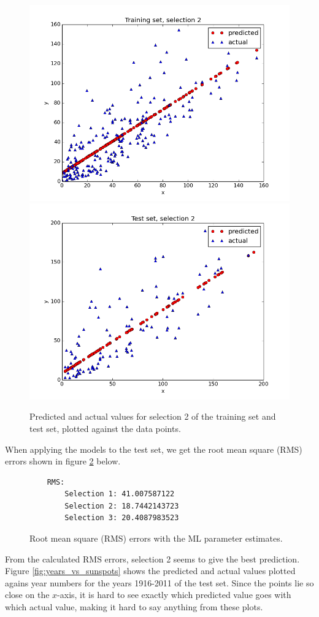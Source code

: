 \documentclass[a4paper]{article}
\begin{document}
\begin{figure}[H]
  \begin{adjustwidth}{-7em}{-7em}
    \centering
    \includegraphics[width=.47\linewidth]{figures/training_set_selection2.png}
    \includegraphics[width=.47\linewidth]{figures/test_set_selection2.png}
  \end{adjustwidth}
  \caption{Predicted and actual values for selection 2 of the training set and test set, plotted against the data points.}
  \label{fig:selection2}
\end{figure}

When applying the models to the test set, we get the root mean square (RMS) errors shown in figure \ref{fig:rms_ml} below.

\begin{figure}[H]
	\begin{lstlisting}
	RMS:
        Selection 1: 41.007587122
        Selection 2: 18.7442143723
        Selection 3: 20.4087983523
	\end{lstlisting}
	\caption{Root mean square (RMS) errors with the ML parameter estimates.}
	\label{fig:rms_ml}
\end{figure}

From the calculated RMS errors, selection 2 seems to give the best prediction. Figure \ref{fig:years_vs_sunspots} shows the predicted and actual values plotted agains year numbers for the years 1916-2011 of the test set. Since the points lie so close on the $x$-axis, it is hard to see exactly which predicted value goes with which actual value, making it hard to say anything from these plots.
\end{document}
